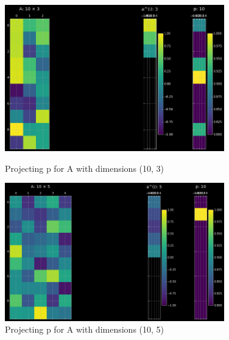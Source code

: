 \begin{figure}
    \centering
    \includegraphics[width=0.85\textwidth]{figs/dim3.png}
    \caption{Projecting p for A with dimensions (10, 3)}
    \label{fig:my_label1}
    \vspace{5mm}
    \includegraphics[width=0.85\textwidth]{figs/dim5.png}
    \caption{Projecting p for A with dimensions (10, 5)}
    \label{fig:my_label2}
\end{figure}